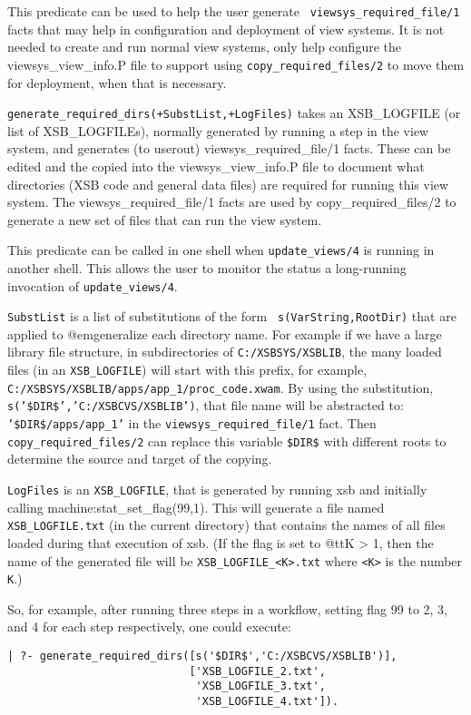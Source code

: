 \begin{description}
%
This predicate can be used to help the user generate {\tt
  viewsys\_required\_file/1} facts that may help in configuration and
deployment of view systems.  It is not needed to create and run normal
view systems, only help configure the viewsys\_view\_info.P file to
support using {\tt copy\_required\_files/2} to move them for
deployment, when that is necessary.

{\tt generate\_required\_dirs(+SubstList,+LogFiles)} takes an
XSB\_LOGFILE (or list of XSB\_LOGFILEs), normally generated by running a
step in the view system, and generates (to userout)
viewsys\_required\_file/1 facts.  These can be edited and the copied
into the viewsys\_view\_info.P file to document what directories (XSB
code and general data files) are required for running this view
system.  The viewsys\_required\_file/1 facts are used by
copy\_required\_files/2 to generate a new set of files that can run the
view system.

This predicate can be called in one shell when {\tt update\_views/4}
is running in another shell.  This allows the user to monitor the
status a long-running invocation of {\tt update\_views/4}.

{\tt SubstList} is a list of substitutions of the form {\tt
  s(VarString,RootDir)} that are applied to @em{generalize} each
directory name.  For example if we have a large library file
structure, in subdirectories of {\tt C:/XSBSYS/XSBLIB}, the many
loaded files (in an {\tt XSB\_LOGFILE}) will start with this prefix,
for example, {\tt C:/XSBSYS/XSBLIB/apps/app\_1/proc\_code.xwam}.  By
using the substitution, {\tt s('\$DIR\$','C:/XSBCVS/XSBLIB')}, that
file name will be abstracted to: {\tt '\$DIR\$/apps/app\_1'} in the
{\tt viewsys\_required\_file/1} fact.  Then {\tt
  copy\_required\_files/2} can replace this variable {\tt \$DIR\$}
with different roots to determine the source and target of the
copying.

{\tt LogFiles} is an {\tt XSB\_LOGFILE}, that is generated by running
xsb and initially calling machine:stat\_set\_flag(99,1).  This will
generate a file named {\tt XSB\_LOGFILE.txt} (in the current
directory) that contains the names of all files loaded during that
execution of xsb.  (If the flag is set to @{tt}K > 1, then the name of
the generated file will be {\tt XSB\_LOGFILE\_<K>.txt} where {\tt <K>} is
the number {\tt K}.)

So, for example, after running three steps in a workflow, setting flag
99 to 2, 3, and 4 for each step respectively, one could execute:
\begin{verbatim}	   
| ?- generate_required_dirs([s('$DIR$','C:/XSBCVS/XSBLIB')],
                            ['XSB_LOGFILE_2.txt',
                             'XSB_LOGFILE_3.txt',
                             'XSB_LOGFILE_4.txt']).
\end{verbatim}	   


\end{description}
